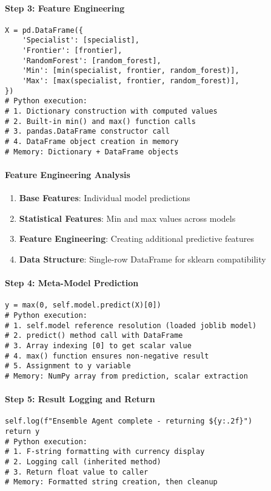 \paragraph{Step 3: Feature Engineering}
\begin{lstlisting}[caption=DataFrame Construction Analysis]
X = pd.DataFrame({
    'Specialist': [specialist],
    'Frontier': [frontier],
    'RandomForest': [random_forest],
    'Min': [min(specialist, frontier, random_forest)],
    'Max': [max(specialist, frontier, random_forest)],
})
# Python execution:
# 1. Dictionary construction with computed values
# 2. Built-in min() and max() function calls
# 3. pandas.DataFrame constructor call
# 4. DataFrame object creation in memory
# Memory: Dictionary + DataFrame objects
\end{lstlisting}

\paragraph{Feature Engineering Analysis}
\begin{enumerate}
\item \textbf{Base Features}: Individual model predictions
\item \textbf{Statistical Features}: Min and max values across models
\item \textbf{Feature Engineering}: Creating additional predictive features
\item \textbf{Data Structure}: Single-row DataFrame for sklearn compatibility
\end{enumerate}

\paragraph{Step 4: Meta-Model Prediction}
\begin{lstlisting}[caption=Ensemble Model Execution]
y = max(0, self.model.predict(X)[0])
# Python execution:
# 1. self.model reference resolution (loaded joblib model)
# 2. predict() method call with DataFrame
# 3. Array indexing [0] to get scalar value
# 4. max() function ensures non-negative result
# 5. Assignment to y variable
# Memory: NumPy array from prediction, scalar extraction
\end{lstlisting}

\paragraph{Step 5: Result Logging and Return}
\begin{lstlisting}[caption=Completion Processing]
self.log(f"Ensemble Agent complete - returning ${y:.2f}")
return y
# Python execution:
# 1. F-string formatting with currency display
# 2. Logging call (inherited method)
# 3. Return float value to caller
# Memory: Formatted string creation, then cleanup
\end{lstlisting}

